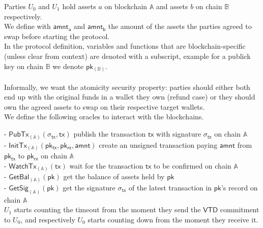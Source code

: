 \documentclass{article}      	%
\begin{document}
Parties $U_0$ and $U_1$ hold assets $a$ on blockchain $\mathbb{A}$ and assets $b$ on chain $\mathbb{B}$ respectively. \\
We define with $\mathsf{amnt_a}$ and $\mathsf{amnt_b}$ the amount of the assets the parties agreed to swap before starting the protocol. \\
In the protocol definition, variables and functions that are blockchain-specific (unless clear from context) are denoted with a subscript, example for a publick key on chain $\mathbb{B}$ we denote $\mathsf{pk_{(\mathbb{B})}}$. \\
\\

Informally, we want the atomicity security property: parties should either both end up with the original funds in a wallet they own (refund case) or they should own the agreed assets to swap on their respective target wallets. \\

We define the following oracles to interact with the blockchains.

- $\mathsf{PubTx}_{(\mathbb{A})}(\sigma_{\mathsf{tx}}, \mathsf{tx})$ publish the transaction $\mathsf{tx}$ with signature $\sigma_{\mathsf{tx}}$ on chain $\mathbb{A}$ \\
- $\mathsf{InitTx}_{(\mathbb{A})}(\mathsf{pk_{tx}}, \mathsf{pk_{rx}}, \mathsf{amnt})$ create an unsigned transaction paying $\mathsf{amnt}$ from $\mathsf{pk_{tx}}$ to $\mathsf{pk_{rx}}$ on chain $\mathbb{A}$ \\
- $\mathsf{WatchTx}_{(\mathbb{A})}(\mathsf{tx})$ wait for the transaction $\mathsf{tx}$ to be confirmed on chain $\mathbb{A}$ \\
- $\mathsf{GetBal}_{(\mathbb{A})}(\mathsf{pk})$ get the balance of assets held by $\mathsf{pk}$ \\
- $\mathsf{GetSig}_{(\mathbb{A})}(\mathsf{pk})$ get the signature $\sigma_{\mathsf{tx}}$ of the latest transaction in $\mathsf{pk}$'s record on chain $\mathbb{A}$ \\

$U_1$ starts counting the timeout from the moment they send the $\mathsf{VTD}$ commitment to $U_0$, and respectively $U_0$ starts counting down from the moment they receive it. \\
\\
\end{document}
